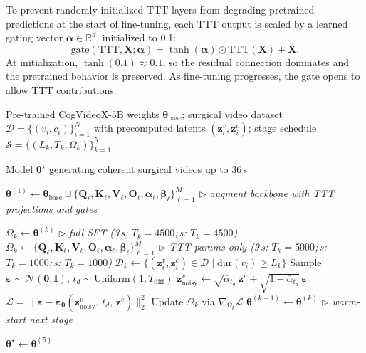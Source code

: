 \documentclass[runningheads]{llncs}
\newcommand{\mycomment}[1]{%
  \hfill\textcolor{commentgray}{\(\triangleright\) \textit{#1}}}
\newcommand{\BlankLine}{\vspace{4pt}}
\newcommand{\btheta}{\bm{\theta}}
\newcommand{\bz}{\mathbf{z}}
\newcommand{\beps}{\bm{\varepsilon}}
\newcommand{\Loss}{\mathcal{L}}
\newcommand{\Dataset}{\mathcal{D}}
\begin{document}
To prevent randomly initialized TTT layers from degrading pretrained predictions at the start of fine-tuning, each TTT output is scaled by a learned gating vector $\bm{\alpha} \in \mathbb{R}^d$, initialized to 0.1\cite{dalal2025oneminutevideogenerationtesttime}:
\begin{equation}
    \mathrm{gate}(\mathrm{TTT}, \mathbf{X}; \bm{\alpha}) = \tanh(\bm{\alpha}) \odot \mathrm{TTT}(\mathbf{X}) + \mathbf{X}.
\end{equation}
At initialization, $\tanh(0.1) \approx 0.1$, so the residual connection dominates and the pretrained behavior is preserved. As fine-tuning progresses, the gate opens to allow TTT contributions.

\begin{algorithm}[t]
\caption{Curriculum Fine-Tuning of DiT with TTT Layers}
\label{alg:ttt_curriculum}
\begin{algorithmic}[1]

\Require
  Pre-trained CogVideoX-5B weights $\btheta_{\text{base}}$;
  surgical video dataset $\Dataset = \{(v_i, c_i)\}_{i=1}^{N}$
  with precomputed latents $(\bz^v_i, \bz^c_i)$;
  stage schedule $\mathcal{S} = \{(L_k, T_k, \Omega_k)\}_{k=1}^{5}$

\Ensure
  Model $\btheta^{\star}$ generating coherent surgical videos up to 36\,s

\BlankLine

\State $\btheta^{(1)} \leftarrow
  \btheta_{\text{base}}
  \cup
  \bigl\{\mathbf{Q}_\ell,\mathbf{K}_\ell,\mathbf{V}_\ell,\mathbf{O}_\ell,\bm{\alpha}_\ell,\bm{\beta}_\ell
  \bigr\}_{\ell=1}^{M}$
\mycomment{augment backbone with TTT projections and gates}

    \State $\Omega_k \leftarrow \btheta^{(k)}$
    \mycomment{full SFT \;(3\,s: $T_k{=}4500$;\,s: $T_k{=}4500$)}
  \Else
    \State $\Omega_k \leftarrow
      \bigl\{\mathbf{Q}_\ell,\mathbf{K}_\ell,\mathbf{V}_\ell,\mathbf{O}_\ell,\bm{\alpha}_\ell,\bm{\beta}_\ell
      \bigr\}_{\ell=1}^{M}$
    \mycomment{TTT params only \;(9\,s: $T_k{=}5000$;\,s: $T_k{=}1000$;\; 36\,s: $T_k{=}1000$)}
  \EndIf
  \State $\Dataset_k \leftarrow
    \{(\bz^v_i, \bz^c_i) \in \Dataset \mid \mathrm{dur}(v_i) \geq L_k\}$
    \For{each mini-batch $\mathcal{B} \subseteq \Dataset_k$}
      \State Sample $\beps \sim \mathcal{N}(\mathbf{0},\mathbf{I})$,\;
             $t_d \sim \mathrm{Uniform}(1, T_{\mathrm{diff}})$
      \State $\bz^v_{\mathrm{noisy}} \leftarrow
             \sqrt{\bar\alpha_{t_d}}\,\bz^v +
             \sqrt{1{-}\bar\alpha_{t_d}}\,\beps$
      \State $\Loss =
        \bigl\|\beps - \beps_{\btheta}(\bz^v_{\mathrm{noisy}},\,
        t_d,\, \bz^c)\bigr\|_2^2$
      \State Update $\Omega_k$ via $\nabla_{\Omega_k}\Loss$
    \EndFor
  \EndFor
  \State $\btheta^{(k+1)} \leftarrow \btheta^{(k)}$
  \mycomment{warm-start next stage}
\EndFor

\State \Return $\btheta^{\star} \leftarrow \btheta^{(5)}$

\end{algorithmic}
\end{algorithm}
\end{document}
